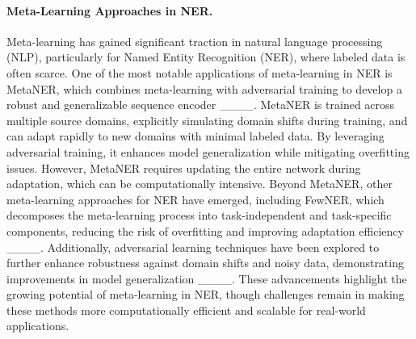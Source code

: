 \paragraph{Meta-Learning Approaches in NER.}  
Meta-learning has gained significant traction in natural language processing (NLP), particularly for Named Entity Recognition (NER), where labeled data is often scarce. One of the most notable applications of meta-learning in NER is MetaNER, which combines meta-learning with adversarial training to develop a robust and generalizable sequence encoder ____. MetaNER is trained across multiple source domains, explicitly simulating domain shifts during training, and can adapt rapidly to new domains with minimal labeled data. By leveraging adversarial training, it enhances model generalization while mitigating overfitting issues. However, MetaNER requires updating the entire network during adaptation, which can be computationally intensive.
Beyond MetaNER, other meta-learning approaches for NER have emerged, including FewNER, which decomposes the meta-learning process into task-independent and task-specific components, reducing the risk of overfitting and improving adaptation efficiency ____. Additionally, adversarial learning techniques have been explored to further enhance robustness against domain shifts and noisy data, demonstrating improvements in model generalization ____. These advancements highlight the growing potential of meta-learning in NER, though challenges remain in making these methods more computationally efficient and scalable for real-world applications.

